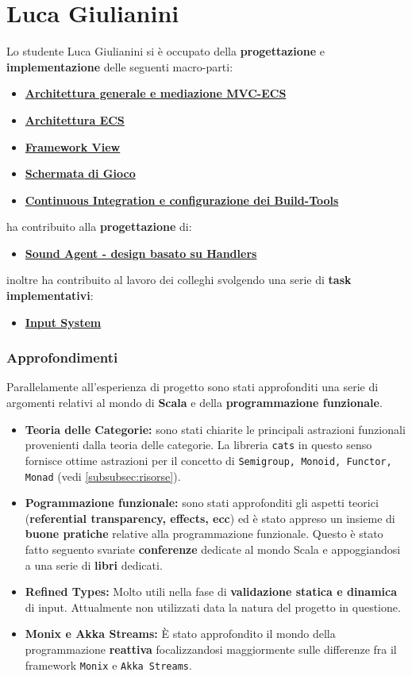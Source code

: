 \section{Luca Giulianini}
Lo studente Luca Giulianini si è occupato della \textbf{progettazione} e \textbf{implementazione} delle seguenti macro-parti:
\begin{itemize}
	\item \hyperref[subsec:arc_mediator]{\textbf{Architettura generale e mediazione MVC-ECS}}
	\item \hyperref[subsec:arc_ecs]{\textbf{Architettura ECS}}
	\item \hyperref[subsec:arc_view]{\textbf{Framework View}}
	\item \hyperref[subsec:game_screen]{\textbf{Schermata di Gioco}}
	\item \hyperref[subsec:ci]{\textbf{Continuous Integration e configurazione dei Build-Tools}}
\end{itemize}
ha contribuito alla \textbf{progettazione} di:
\begin{itemize}
	\item \hyperref[subsec:media_event]{\textbf{Sound Agent - design basato su Handlers}}
\end{itemize}
inoltre ha contribuito al lavoro dei colleghi svolgendo una serie di \textbf{task implementativi}:
\begin{itemize}
	\item \hyperref[subsubsec:input_sys]{\textbf{Input System}}
\end{itemize}

\subsubsection{Approfondimenti}
Parallelamente all'esperienza di progetto sono stati approfonditi una serie di argomenti relativi al mondo di \textbf{Scala} e della \textbf{programmazione funzionale}. 
\begin{itemize}
	\item{\textbf{Teoria delle Categorie:}} sono stati chiarite le principali astrazioni funzionali provenienti dalla teoria delle categorie. La libreria \texttt{cats} in questo senso fornisce ottime astrazioni per il concetto di \texttt{Semigroup, Monoid, Functor, Monad} (vedi \ref{subsubsec:risorse}).
	\item{\textbf{Pogrammazione funzionale:}} sono stati approfonditi gli aspetti teorici (\textbf{referential transparency, effects, ecc}) ed è stato appreso un insieme di \textbf{buone pratiche} relative alla programmazione funzionale. Questo è stato fatto seguento svariate \textbf{conferenze} dedicate al mondo Scala e appoggiandosi a una serie di \textbf{libri} dedicati. 
	\item{\textbf{Refined Types:}} Molto utili nella fase di \textbf{validazione statica e dinamica} di input. Attualmente non utilizzati data la natura del progetto in questione.
	\item{\textbf{Monix e Akka Streams:}} È stato approfondito il mondo della programmazione \textbf{reattiva} focalizzandosi maggiormente sulle differenze fra il framework \texttt{Monix} e \texttt{Akka Streams}.
\end{itemize}

